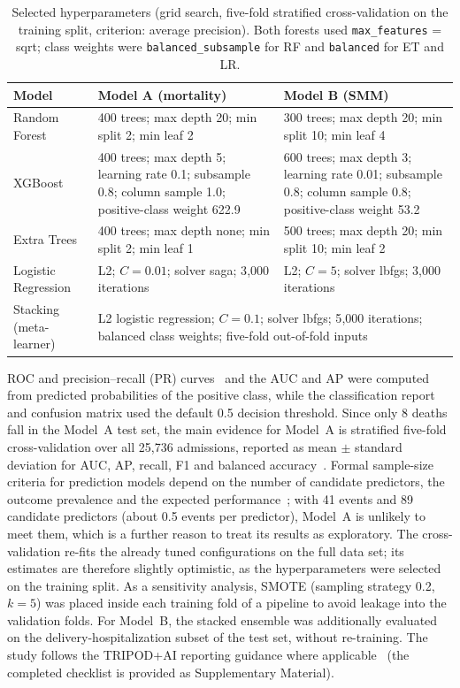 \documentclass[healthcare,article,submit,pdftex,moreauthors]{Definitions/mdpi}
\begin{document}
\begin{table}[H]
\caption{Selected hyperparameters (grid search, five-fold stratified cross-validation on the training split, criterion: average precision).
Both forests used \texttt{max\_features} = sqrt; class weights were \texttt{balanced\_subsample} for RF and \texttt{balanced} for ET and LR.\label{tab:hyper}}
\small
\begin{tabularx}{\textwidth}{lXX}
\toprule
\textbf{Model} & \textbf{Model A (mortality)} & \textbf{Model B (SMM)}\\
\midrule
Random Forest & 400 trees; max depth 20; min split 2; min leaf 2 & 300 trees; max depth 20; min split 10; min leaf 4\\
XGBoost & 400 trees; max depth 5; learning rate 0.1; subsample 0.8; column sample 1.0; positive-class weight 622.9 & 600 trees; max depth 3; learning rate 0.01; subsample 0.8; column sample 0.8; positive-class weight 53.2\\
Extra Trees & 400 trees; max depth none; min split 2; min leaf 1 & 500 trees; max depth 20; min split 10; min leaf 2\\
Logistic Regression & L2; $C=0.01$; solver saga; 3{,}000 iterations & L2; $C=5$; solver lbfgs; 3{,}000 iterations\\
Stacking (meta-learner) & \multicolumn{2}{p{0.6\textwidth}}{L2 logistic regression; $C=0.1$; solver lbfgs; 5{,}000 iterations; balanced class weights; five-fold out-of-fold inputs}\\
\bottomrule
\end{tabularx}
\end{table}


ROC and precision--recall (PR) curves~\cite{Fawcett2006ROC,Saito2015PR} and the AUC and AP were computed from predicted
probabilities of the positive class, while the classification report and confusion
matrix used the default 0.5 decision threshold. Since only 8 deaths fall in the
Model~A test set, the main evidence for Model~A is stratified five-fold
cross-validation over all 25{,}736 admissions, reported as mean $\pm$ standard
deviation for AUC, AP, recall, F1 and balanced accuracy~\cite{Arlot2010CV}. Formal sample-size criteria for prediction models depend on the number of candidate predictors, the outcome prevalence and the expected performance~\cite{Riley2020SampleSize}; with 41 events and 89 candidate predictors (about 0.5 events per predictor), Model~A is unlikely to meet them, which is a further reason to treat its results as exploratory. The
cross-validation re-fits the already tuned configurations on the full data set; its
estimates are therefore slightly optimistic, as the hyperparameters were selected on
the training split. As a sensitivity analysis, SMOTE (sampling strategy 0.2,
$k=5$) was placed inside each training fold of a pipeline to avoid leakage into the
validation folds. For Model~B, the stacked ensemble was additionally evaluated on
the delivery-hospitalization subset of the test set, without re-training.
The study follows the TRIPOD+AI reporting guidance where applicable~\cite{Collins2024TRIPODAI}
(the completed checklist is provided as Supplementary Material).
\end{document}
